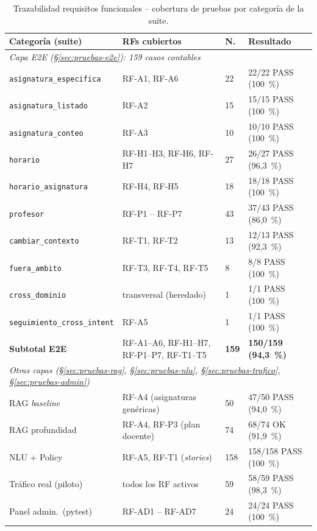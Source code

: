 \begin{table}[hbtp]
\centering
\footnotesize
\caption{Trazabilidad requisitos funcionales -- cobertura de pruebas por categoría de la suite.}\label{tab:traz-rf-pruebas}
\begin{tabular}{|p{3.6cm}|p{2.8cm}|p{1.1cm}|p{2.5cm}|}
\hline
\textbf{Categoría (suite)} & \textbf{RFs cubiertos} & \textbf{N.} & \textbf{Resultado} \\ \hline
\multicolumn{4}{|l|}{\textit{Capa E2E (\S\ref{sec:pruebas-e2e}): 159 casos contables}} \\ \hline
\texttt{asignatura\_\allowbreak especifica} & RF-A1, RF-A6 & 22 & 22/22 PASS (100~\%) \\ \hline
\texttt{asignatura\_\allowbreak listado} & RF-A2 & 15 & 15/15 PASS (100~\%) \\ \hline
\texttt{asignatura\_\allowbreak conteo} & RF-A3 & 10 & 10/10 PASS (100~\%) \\ \hline
\texttt{horario} & RF-H1--H3, RF-H6, RF-H7 & 27 & 26/27 PASS (96,3~\%) \\ \hline
\texttt{horario\_\allowbreak asignatura} & RF-H4, RF-H5 & 18 & 18/18 PASS (100~\%) \\ \hline
\texttt{profesor} & RF-P1 -- RF-P7 & 43 & 37/43 PASS (86,0~\%) \\ \hline
\texttt{cambiar\_\allowbreak contexto} & RF-T1, RF-T2 & 13 & 12/13 PASS (92,3~\%) \\ \hline
\texttt{fuera\_\allowbreak ambito} & RF-T3, RF-T4, RF-T5 & 8 & 8/8 PASS (100~\%) \\ \hline
\texttt{cross\_\allowbreak dominio} & transversal (heredado) & 1 & 1/1 PASS (100~\%) \\ \hline
\texttt{seguimiento\_\allowbreak cross\_\allowbreak intent} & RF-A5 & 1 & 1/1 PASS (100~\%) \\ \hline
\textbf{Subtotal E2E} & RF-A1--A6, RF-H1--H7, RF-P1--P7, RF-T1--T5 & \textbf{159} & \textbf{150/159 (94,3~\%)} \\ \hline
\multicolumn{4}{|l|}{\textit{Otras capas (\S\ref{sec:pruebas-rag}, \S\ref{sec:pruebas-nlu}, \S\ref{sec:pruebas-trafico}, \S\ref{sec:pruebas-admin})}} \\ \hline
RAG \textit{baseline} & RF-A4 (asignaturas genéricas) & 50 & 47/50 PASS (94,0~\%) \\ \hline
RAG profundidad & RF-A4, RF-P3 (plan docente) & 74 & 68/74 OK (91,9~\%) \\ \hline
NLU + Policy & RF-A5, RF-T1 (\textit{stories}) & 158 & 158/158 PASS (100~\%) \\ \hline
Tráfico real (piloto) & todos los RF activos & 59 & 58/59 PASS (98,3~\%) \\ \hline
Panel admin.\ (pytest) & RF-AD1 -- RF-AD7 & 24 & 24/24 PASS (100~\%) \\ \hline
\end{tabular}
\end{table}


